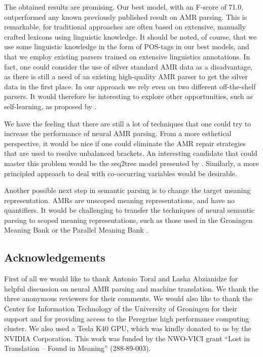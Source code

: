 \documentclass[a4paper,10pt,twoside]{article}
\begin{document}
The obtained results are promising. 
Our best model, with an F-score of 71.0, outperformed any known previously published result on AMR parsing. This is remarkable, for traditional approaches are often based on extensive, manually crafted lexicons using linguistic knowledge. It should be noted, of course, that we use some linguistic knowledge in the form of POS-tags in our best models, and that we employ existing parsers trained on extensive linguistics annotations. In fact, one could consider the use of silver standard AMR data as a disadvantage, as there is still a need of an existing high-quality AMR parser to get the silver data in the first place. In our approach we rely even on two different off-the-shelf parsers. It would therefore be interesting to explore other opportunities, such as self-learning, as proposed by .

We have the feeling that there are still a lot of techniques that one could try to increase the performance of neural AMR parsing. From a more esthetical perspective, it would be nice if one could eliminate the AMR repair strategies that are used to resolve unbalanced brackets. An interesting candidate that could master this problem would be the seq2tree model presented by . Similarly, a more principled approach to deal with co-occurring variables would be desirable.

Another possible next step in semantic parsing is to change the target meaning representation. AMRs are unscoped meaning representations, and have no quantifiers. It would be challenging to transfer the techniques of neural semantic parsing to scoped meaning representations, such as those used in the Groningen Meaning Bank \cite{gmb:lrec} or the Parallel Meaning Bank \cite{eacl:pmb}.

\subsection*{Acknowledgements}

First of all we would like to thank Antonio Toral and Lasha Abzianidze for helpful discussion on neural AMR parsing and machine translation.
We thank the three anonymous reviewers for their comments. 
We would also like to thank the Center for  Information  Technology  of  the  University  of Groningen for their support and for providing access to the Peregrine high performance computing cluster. We also used a Tesla K40 GPU, which was kindly donated to us by the NVIDIA Corporation. This work was funded by the NWO-VICI grant ``Lost in Translation – Found in Meaning'' (288-89-003).

 
  
\end{document}
